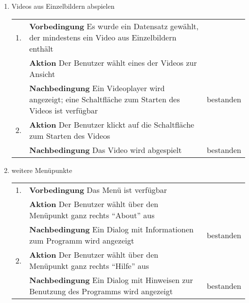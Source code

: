 \begin{enumerate} [label=\bfseries /TS \arabic*0/, leftmargin=*]
	\item Videos aus Einzelbildern abspielen \label{ts:video_abspielen} \newline \newline
	\begin{tabular}{rp{4in}|l}
	1. & \textbf{Vorbedingung} Es wurde ein Datensatz gewählt, der mindestens ein Video aus Einzelbildern enthält & \\
	   & \textbf{Aktion} Der Benutzer wählt eines der Videos zur Ansicht & \\
	   & \textbf{Nachbedingung} Ein Videoplayer wird angezeigt; eine Schaltfläche zum Starten des Videos ist verfügbar & bestanden \\
	\hline
	2. & \textbf{Aktion} Der Benutzer klickt auf die Schaltfläche zum Starten des Videos & \\
	   & \textbf{Nachbedingung} Das Video wird abgespielt & bestanden \\
	\end{tabular}
	\newline

	\item weitere Menüpunkte \label{ts:weitere_menuepunkte} \newline \newline
	\begin{tabular}{rp{4in}|l}
	1. & \textbf{Vorbedingung} Das Menü ist verfügbar & \\
	   & \textbf{Aktion} Der Benutzer wählt über den Menüpunkt ganz rechts \enquote{About} aus & \\
	   & \textbf{Nachbedingung} Ein Dialog mit Informationen zum Programm wird angezeigt & bestanden \\
	\hline
	2. & \textbf{Aktion} Der Benutzer wählt über den Menüpunkt ganz rechts \enquote{Hilfe} aus & \\
	   & \textbf{Nachbedingung} Ein Dialog mit Hinweisen zur Benutzung des Programms wird angezeigt & bestanden \\
	\end{tabular}
\end{enumerate}


